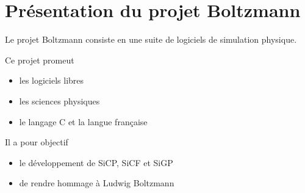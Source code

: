 %

\section{Présentation du projet Boltzmann}
%
Le projet Boltzmann consiste en une suite de logiciels de simulation physique. 

Ce projet promeut
\begin{itemize}[leftmargin=2cm, label=, itemsep=0pt]%
\item les logiciels libres
\item les sciences physiques
\item le langage C et la langue française
\end{itemize}

Il a pour objectif
\begin{itemize}[leftmargin=2cm, label=, itemsep=0pt]%
\item le développement de SiCP, SiCF et SiGP
\item de rendre hommage à Ludwig Boltzmann
\end{itemize}
